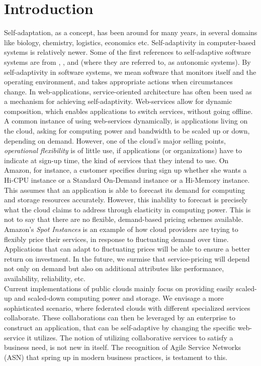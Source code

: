 \documentclass[10pt,journal,compsoc]{IEEEtran}
\begin{document}
\section{Introduction}
Self-adaptation, as a concept, has been around for many years, in several domains like biology, chemistry, logistics, economics etc. Self-adaptivity in computer-based systems is relatively newer. Some of the first references to self-adaptive software systems are from \cite{Oreizy1998Architecture-based}, \cite{Laddaga1999Creating}, \cite{Kokar1999Control} and \cite{Kephart2003Vision} (where they are referred to, as autonomic systems). By self-adaptivity in software systems, we mean software that monitors itself and the operating environment, and takes appropriate actions when circumstances change. In web-applications, service-oriented architecture has often been used as a mechanism for achieving self-adaptivity\cite{DiNitto2008journey}. Web-services allow for dynamic composition, which enables applications to switch services, without going offline. A common instance of using web-services dynamically, is applications living on the cloud, asking for computing power and bandwidth to be scaled up or down, depending on demand. However, one of the cloud's major selling points, \textit{operational flexibility} is of little use, if applications (or organizations) have to indicate at sign-up time, the kind of services that they intend to use. On Amazon, for instance, a customer specifies during sign up whether she wants a Hi-CPU instance or a Standard On-Demand instance or a Hi-Memory instance. This assumes that an application is able to forecast its demand for computing and storage resources accurately. However, this inability to forecast is precisely what the cloud claims to address through elasticity in computing power. This is not to say that there are no flexible, demand-based pricing schemes available. Amazon's \textit{Spot Instances} \cite{Amazon2010SpotInstance} is an example of how cloud providers are trying to flexibly price their services, in response to fluctuating demand over time. Applications that can adapt to fluctuating prices will be able to ensure a better return on investment. In the future, we surmise that service-pricing will depend not only on demand but also on additional attributes like performance, availability, reliability, etc.
\\ 
Current implementations of public clouds mainly focus on providing easily scaled-up and scaled-down computing power and storage. We envisage a more sophisticated scenario, where federated clouds with different specialized services collaborate. These collaborations can then be leveraged by an enterprise to construct an application, that can be self-adaptive by changing the specific web-service it utilizes. The notion of utilizing collaborative services to satisfy a business need, is not new in itself. The recognition of Agile Service Networks (ASN) that spring up in modern business practices, is testament to this. 
\end{document}

